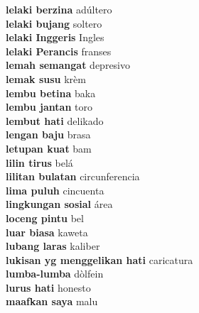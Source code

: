 \textbf{ lelaki berzina  } adúltero \\
\textbf{ lelaki bujang  } soltero \\
\textbf{ lelaki Inggeris  } Ingles \\
\textbf{ lelaki Perancis  } franses \\
\textbf{ lemah semangat  } depresivo \\
\textbf{ lemak susu  } krèm \\
\textbf{ lembu betina  } baka \\
\textbf{ lembu jantan  } toro \\
\textbf{ lembut hati  } delikado \\
\textbf{ lengan baju  } brasa \\
\textbf{ letupan kuat  } bam \\
\textbf{ lilin tirus  } belá \\
\textbf{ lilitan bulatan  } circunferencia \\
\textbf{ lima puluh  } cincuenta \\
\textbf{ lingkungan sosial  } área \\
\textbf{ loceng pintu  } bel \\
\textbf{ luar biasa  } kaweta \\
\textbf{ lubang laras  } kaliber \\
\textbf{ lukisan yg menggelikan hati  } caricatura \\
\textbf{ lumba-lumba  } dòlfein \\
\textbf{ lurus hati  } honesto \\
\textbf{ maafkan saya  } malu \\
